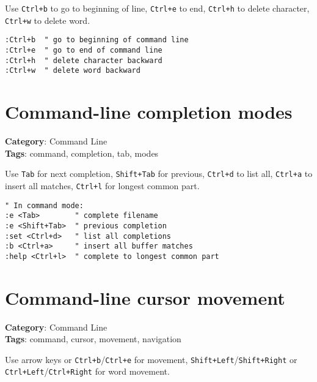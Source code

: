 {{{Use {\footnotesize \Verb§Ctrl+b§} to go to beginning of line, {\footnotesize \Verb§Ctrl+e§} to end, {\footnotesize \Verb§Ctrl+h§} to delete character, {\footnotesize \Verb§Ctrl+w§} to delete word.

\begin{Exa*}{}
\begin{Verbatim}[fontsize=\footnotesize, breaklines, breakanywhere]
:Ctrl+b  " go to beginning of command line
:Ctrl+e  " go to end of command line
:Ctrl+h  " delete character backward
:Ctrl+w  " delete word backward
\end{Verbatim}
\end{Exa*}

\section{Command-line completion modes}

\textbf{Category}: Command Line\\ \textbf{Tags}: command, completion, tab, modes
\vspace{0.5cm}

Use {\footnotesize \Verb§Tab§} for next completion, {\footnotesize \Verb§Shift+Tab§} for previous, {\footnotesize \Verb§Ctrl+d§} to list all, {\footnotesize \Verb§Ctrl+a§} to insert all matches, {\footnotesize \Verb§Ctrl+l§} for longest common part.

\begin{Exa*}{}
\begin{Verbatim}[fontsize=\footnotesize, breaklines, breakanywhere]
" In command mode:
:e <Tab>        " complete filename
:e <Shift+Tab>  " previous completion
:set <Ctrl+d>   " list all completions
:b <Ctrl+a>     " insert all buffer matches
:help <Ctrl+l>  " complete to longest common part
\end{Verbatim}
\end{Exa*}

\section{Command-line cursor movement}

\textbf{Category}: Command Line\\ \textbf{Tags}: command, cursor, movement, navigation
\vspace{0.5cm}

Use arrow keys or {\footnotesize \Verb§Ctrl+b§}/{\footnotesize \Verb§Ctrl+e§} for movement, {\footnotesize \Verb§Shift+Left§}/{\footnotesize \Verb§Shift+Right§} or {\footnotesize \Verb§Ctrl+Left§}/{\footnotesize \Verb§Ctrl+Right§} for word movement.

}}}
